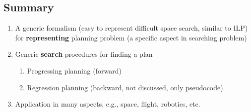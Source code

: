 \subsection{Summary}
\begin{enumerate}
    \item A generic formalism (easy to represent difficult space search, similar to ILP) for \textbf{representing} planning problem (a specific aspect in searching problem)
    \item Generic \textbf{search} procedures for finding a plan
    \begin{enumerate}
        \item Progressing planning (forward)
        \item Regression planning (backward, not discussed, only pseudocode)
    \end{enumerate}
    \item Application in many aspects, e.g., space, flight, robotics, etc.
\end{enumerate}


\pagebreak